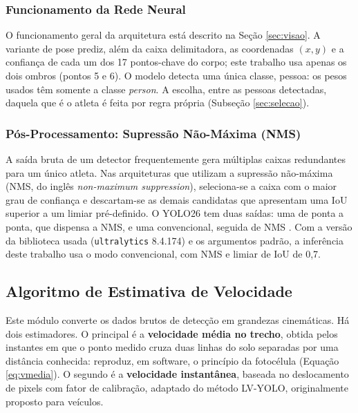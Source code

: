 \documentclass[
    12pt,               %
    openright,          %
    twoside,            %
    a4paper,            %
    chapter=TITLE,      %
    english,            %
    brazil              %
    ]{abntex2}
\begin{document}
\subsubsection{Funcionamento da Rede Neural}
O funcionamento geral da arquitetura está descrito na Seção \ref{sec:visao}. A variante de pose prediz, além da caixa delimitadora, as coordenadas $(x, y)$ e a confiança de cada um dos 17 pontos-chave do corpo; este trabalho usa apenas os dois ombros (pontos 5 e 6). O modelo detecta uma única classe, pessoa: os pesos usados têm somente a classe \textit{person}. A escolha, entre as pessoas detectadas, daquela que é o atleta é feita por regra própria (Subseção \ref{sec:selecao}).

\subsubsection{Pós-Processamento: Supressão Não-Máxima (NMS)}
A saída bruta de um detector frequentemente gera múltiplas caixas redundantes para um único atleta. Nas arquiteturas que utilizam a supressão não-máxima (NMS, do inglês \textit{non-maximum suppression}), seleciona-se a caixa com o maior grau de confiança e descartam-se as demais candidatas que apresentam uma IoU superior a um limiar pré-definido. O YOLO26 tem duas saídas: uma de ponta a ponta, que dispensa a NMS, e uma convencional, seguida de NMS \cite{jocher2026yolo26}. Com a versão da biblioteca usada (\texttt{ultralytics} 8.4.174) e os argumentos padrão, a inferência deste trabalho usa o modo convencional, com NMS e limiar de IoU de 0,7.

\subsection{Algoritmo de Estimativa de Velocidade}
\label{sec:estimativa}

Este módulo converte os dados brutos de detecção em grandezas cinemáticas. Há dois estimadores. O principal é a \textbf{velocidade média no trecho}, obtida pelos instantes em que o ponto medido cruza duas linhas do solo separadas por uma distância conhecida: reproduz, em software, o princípio da fotocélula (Equação \ref{eq:vmedia}). O segundo é a \textbf{velocidade instantânea}, baseada no deslocamento de pixels com fator de calibração, adaptado do método LV-YOLO, originalmente proposto para veículos.
\end{document}
